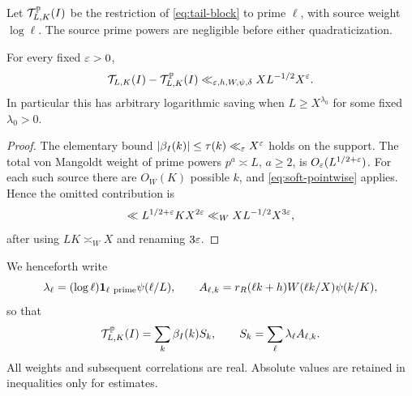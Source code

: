 Let $\mathcal T^{\mathbb P}_{L,K}(I)$ be the restriction of
\eqref{eq:tail-block} to prime $\ell$, with source weight $\log\ell$.
The source prime powers are negligible before either quadraticization.

\begin{lemma}
\label{lem:source-primes}
For every fixed $\varepsilon>0$,
\begin{equation}
 \mathcal T_{L,K}(I)-\mathcal T^{\mathbb P}_{L,K}(I)
 \ll_{\varepsilon,h,W,\psi,\delta}XL^{-1/2}X^\varepsilon.
 \label{eq:source-power-error}
\end{equation}
In particular this has arbitrary logarithmic saving when
$L\ge X^{\lambda_0}$ for some fixed $\lambda_0>0$.
\end{lemma}

\begin{proof}
The elementary bound $|\beta_I(k)|\le\tau(k)\ll_\varepsilon X^\varepsilon$ holds
on the support.  The total von Mangoldt weight of prime powers
$p^a\asymp L$, $a\ge2$, is $O_\varepsilon(L^{1/2+\varepsilon})$.  For each such
source there are $O_W(K)$ possible $k$, and
\eqref{eq:soft-pointwise} applies.  Hence the omitted contribution is
\[
 \ll L^{1/2+\varepsilon}KX^{2\varepsilon}
 \ll_W XL^{-1/2}X^{3\varepsilon},
\]
after using $LK\asymp_WX$ and renaming $3\varepsilon$.
\end{proof}

We henceforth write
\begin{equation}
 \lambda_\ell=(\log\ell)\one_{\ell\ \mathrm{prime}}\psi(\ell/L),
 \qquad
 A_{\ell,k}=r_R(\ell k+h)W(\ell k/X)\psi(k/K),
 \label{eq:lambda-A}
\end{equation}
so that
\begin{equation}
 \mathcal T^{\mathbb P}_{L,K}(I)
 =\sum_k\beta_I(k)S_k,
 \qquad
 S_k=\sum_\ell\lambda_\ell A_{\ell,k}.
 \label{eq:tail-Sk}
\end{equation}
All weights and subsequent correlations are real.  Absolute values are
retained in inequalities only for estimates.
